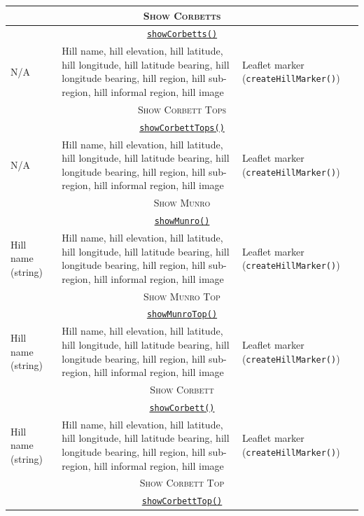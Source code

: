 \documentclass[11pt, english]{article}
\begin{document}
\begin{center}
\begin{longtable}{p{4cm}p{6cm}p{2cm}}
		\hline
		\multicolumn{3}{c}{\textsc{Show Corbetts}}\\
		\hline
		\multicolumn{3}{c}{\underline{\texttt{showCorbetts()}}}\\
		N/A & Hill name, hill elevation, hill latitude, hill longitude, hill latitude bearing, hill longitude bearing, hill region, hill sub-region, hill informal region, hill image & Leaflet marker (\texttt{createHillMarker()})\\
		\hline
		\multicolumn{3}{c}{\textsc{Show Corbett Tops}}\\
		\hline
		\multicolumn{3}{c}{\underline{\texttt{showCorbettTops()}}}\\
		N/A & Hill name, hill elevation, hill latitude, hill longitude, hill latitude bearing, hill longitude bearing, hill region, hill sub-region, hill informal region, hill image & Leaflet marker (\texttt{createHillMarker()})\\
		\hline
		\multicolumn{3}{c}{\textsc{Show Munro}}\\
		\hline
		\multicolumn{3}{c}{\underline{\texttt{showMunro()}}}\\
		Hill name (string) & Hill name, hill elevation, hill latitude, hill longitude, hill latitude bearing, hill longitude bearing, hill region, hill sub-region, hill informal region, hill image & Leaflet marker (\texttt{createHillMarker()})\\
		\hline
		\multicolumn{3}{c}{\textsc{Show Munro Top}}\\
		\hline
		\multicolumn{3}{c}{\underline{\texttt{showMunroTop()}}}\\
		Hill name (string) & Hill name, hill elevation, hill latitude, hill longitude, hill latitude bearing, hill longitude bearing, hill region, hill sub-region, hill informal region, hill image & Leaflet marker (\texttt{createHillMarker()})\\
		\hline
		\multicolumn{3}{c}{\textsc{Show Corbett}}\\
		\hline
		\multicolumn{3}{c}{\underline{\texttt{showCorbett()}}}\\
		Hill name (string) & Hill name, hill elevation, hill latitude, hill longitude, hill latitude bearing, hill longitude bearing, hill region, hill sub-region, hill informal region, hill image & Leaflet marker (\texttt{createHillMarker()})\\
		\hline
		\multicolumn{3}{c}{\textsc{Show Corbett Top}}\\
		\hline
		\multicolumn{3}{c}{\underline{\texttt{showCorbettTop()}}}\\

\end{longtable}
\end{center}
\end{document}
